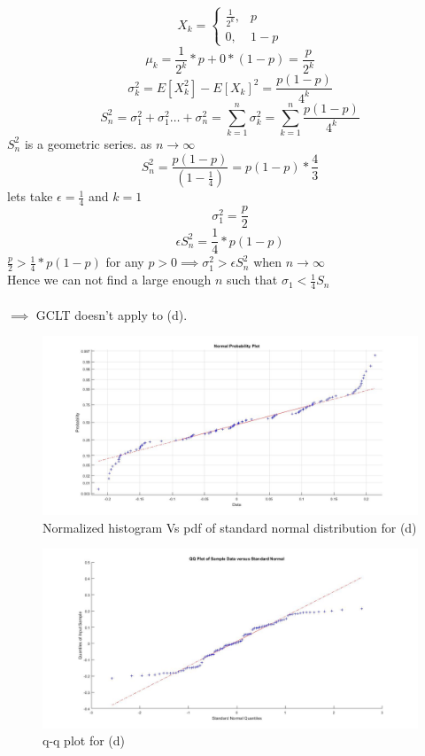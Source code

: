 \documentclass[a4paper,11pt]{article}
\begin{document}
\[
    X_k= 
\begin{cases}
    \frac{1}{2^k}              ,&  p\\
    0 ,             &  1-p
\end{cases}
\]
$$\mu_k = \frac{1}{2^k}*p + 0*(1-p)  =\frac{p}{2^k} $$
$$\sigma_k^2= E[X_k^2]-E[X_k]^2 = \frac{p(1-p)}{4^k}$$
$$S_n^2 = \sigma_1^2 + \sigma_1^2 \dots + \sigma_n^2=\sum_{k=1}^{n}\sigma_k^2 =\sum_{k=1}^{n}\frac{p(1-p)}{4^k} $$
$S_n^2$ is a geometric series.
as $n \to \infty $ $$S_n^2 = \frac{p(1-p)}{(1-\frac{1}{4})} = p(1-p)*\frac{4}{3}$$
lets take $\epsilon = \frac{1}{4}$ and $k=1$\\
$$\sigma_1^2 = \frac{p}{2}$$
$$\epsilon S_n^2 = \frac{1}{4}*p(1-p)$$
$\frac{p}{2}>\frac{1}{4}*p(1-p) $ for any $p>0 \implies \sigma_1^2 > \epsilon S_n^2 $  when $n \to \infty$\\
Hence we can not find a large enough $n$ such that $\sigma_1<\frac{1}{4}S_n$\\\\
$\implies$ GCLT doesn't apply to (d).
\begin{figure}[h]
   \hspace*{-4cm}
    \includegraphics[scale=0.4]{q2_d_1}
    \caption{Normalized histogram Vs pdf of standard normal distribution for (d)}\label{fig:q2_d_1}
\end{figure}
\begin{figure}[h]
   \hspace*{-4cm}
    \includegraphics[scale=0.4]{q2_d_2}
    \caption{q-q plot for (d)}\label{fig:q2_d_2}
\end{figure}
\newpage
\clearpage
\end{document}
